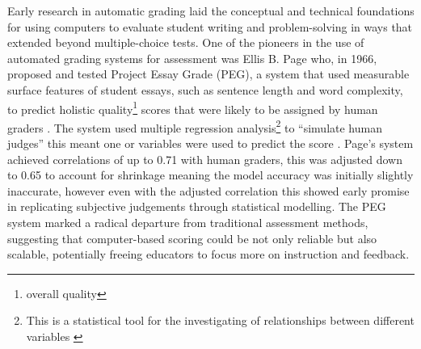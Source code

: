 \documentclass[a4paper,10pt]{article}
\begin{document}
Early research in automatic grading laid the conceptual and technical foundations for using computers to evaluate student writing and problem-solving in ways that extended beyond multiple-choice tests. One of the pioneers in the use of automated grading systems for assessment was Ellis B. Page who, in 1966, proposed and tested Project Essay Grade (PEG), a system that used measurable surface features of student essays, such as sentence length and word complexity, to predict holistic quality\footnote{overall quality} scores that were likely to be assigned by human graders \cite{page1966imminence}. The system used multiple regression analysis\footnote{This is a statistical tool for the investigating of relationships between different variables \cite{sykes1993introduction}} to “simulate human judges” this meant one or variables were used to predict the score \cite{page1966imminence}. Page’s system achieved correlations of up to 0.71 with human graders, this was adjusted down to 0.65 to account for shrinkage meaning the model accuracy was initially slightly inaccurate, however even with the adjusted correlation this showed early promise in replicating subjective judgements through statistical modelling\cite{page1966imminence}. The PEG system marked a radical departure from traditional assessment methods, suggesting that computer-based scoring could be not only reliable but also scalable, potentially freeing educators to focus more on instruction and feedback\cite{page1966imminence}.\newline\newline
\end{document}
